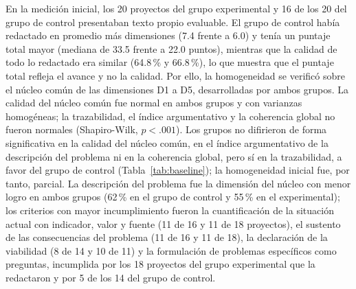 \documentclass[journal]{IEEEtran}
\begin{document}
En la medición inicial, los 20 proyectos del grupo experimental y 16 de los 20 del grupo de control presentaban texto propio evaluable. El grupo de control había redactado en promedio más dimensiones (7.4 frente a 6.0) y tenía un puntaje total mayor (mediana de 33.5 frente a 22.0 puntos), mientras que la calidad de todo lo redactado era similar (64.8\,\% y 66.8\,\%), lo que muestra que el puntaje total refleja el avance y no la calidad. Por ello, la homogeneidad se verificó sobre el núcleo común de las dimensiones D1 a D5, desarrolladas por ambos grupos. La calidad del núcleo común fue normal en ambos grupos y con varianzas homogéneas; la trazabilidad, el índice argumentativo y la coherencia global no fueron normales (Shapiro-Wilk, $p < .001$). Los grupos no difirieron de forma significativa en la calidad del núcleo común, en el índice argumentativo de la descripción del problema ni en la coherencia global, pero sí en la trazabilidad, a favor del grupo de control (Tabla~\ref{tab:baseline}); la homogeneidad inicial fue, por tanto, parcial. La descripción del problema fue la dimensión del núcleo con menor logro en ambos grupos (62\,\% en el grupo de control y 55\,\% en el experimental); los criterios con mayor incumplimiento fueron la cuantificación de la situación actual con indicador, valor y fuente (11 de 16 y 11 de 18 proyectos), el sustento de las consecuencias del problema (11 de 16 y 11 de 18), la declaración de la viabilidad (8 de 14 y 10 de 11) y la formulación de problemas específicos como preguntas, incumplida por los 18 proyectos del grupo experimental que la redactaron y por 5 de los 14 del grupo de control.
\end{document}
